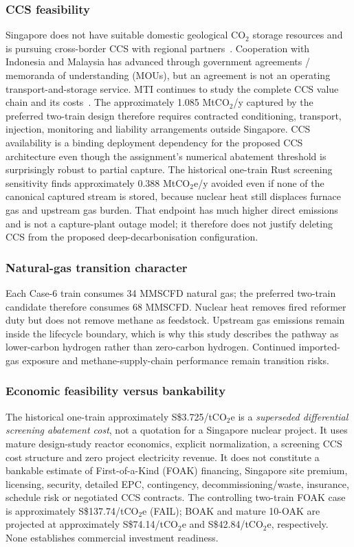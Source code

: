 \subsubsection{CCS feasibility}
Singapore does not have suitable domestic geological CO$_2$ storage resources and is pursuing cross-border CCS with regional partners~\cite{mti2026carbon}. Cooperation with Indonesia and Malaysia has advanced through government agreements / memoranda of understanding (MOUs), but an agreement is not an operating transport-and-storage service. MTI continues to study the complete CCS value chain and its costs~\cite{mticcs2025cost,mti2025indonesiaccs}. The approximately 1.085 MtCO$_2$/y captured by the preferred two-train design therefore requires contracted conditioning, transport, injection, monitoring and liability arrangements outside Singapore. CCS availability is a binding deployment dependency for the proposed CCS architecture even though the assignment's numerical abatement threshold is surprisingly robust to partial capture.  The historical one-train Rust screening sensitivity finds approximately 0.388 MtCO$_2$e/y avoided even if none of the canonical captured stream is stored, because nuclear heat still displaces furnace gas and upstream gas burden.  That endpoint has much higher direct emissions and is not a capture-plant outage model; it therefore does not justify deleting CCS from the proposed deep-decarbonisation configuration.

\subsubsection{Natural-gas transition character}
Each Case-6 train consumes 34 MMSCFD natural gas; the preferred two-train candidate therefore consumes 68 MMSCFD. Nuclear heat removes fired reformer duty but does not remove methane as feedstock. Upstream gas emissions remain inside the lifecycle boundary, which is why this study describes the pathway as lower-carbon hydrogen rather than zero-carbon hydrogen. Continued imported-gas exposure and methane-supply-chain performance remain transition risks.

\subsubsection{Economic feasibility versus bankability}
The historical one-train approximately S\$3.725/tCO$_2$e is a \emph{superseded differential screening abatement cost}, not a quotation for a Singapore nuclear project. It uses mature design-study reactor economics, explicit normalization, a screening CCS cost structure and zero project electricity revenue. It does not constitute a bankable estimate of First-of-a-Kind (FOAK) financing, Singapore site premium, licensing, security, detailed EPC, contingency, decommissioning/waste, insurance, schedule risk or negotiated CCS contracts. The controlling two-train FOAK case is approximately S\$137.74/tCO$_2$e (FAIL); BOAK and mature 10-OAK are projected at approximately S\$74.14/tCO$_2$e and S\$42.84/tCO$_2$e, respectively. None establishes commercial investment readiness.

